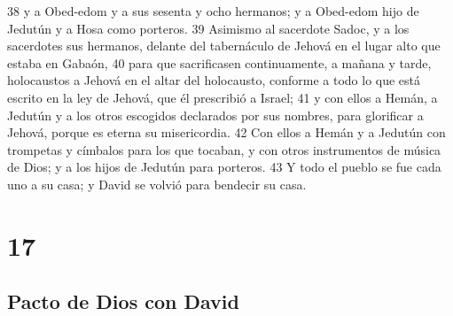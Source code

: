 38 y a Obed-edom y a sus sesenta y ocho hermanos; y a Obed-edom hijo de Jedutún y a Hosa como porteros.
39 Asimismo al sacerdote Sadoc, y a los sacerdotes sus hermanos, delante del tabernáculo de Jehová en el lugar alto que estaba en Gabaón,
40 para que sacrificasen continuamente, a mañana y tarde, holocaustos a Jehová en el altar del holocausto, conforme a todo lo que está escrito en la ley de Jehová, que él prescribió a Israel;
41 y con ellos a Hemán, a Jedutún y a los otros escogidos declarados por sus nombres, para glorificar a Jehová, porque es eterna su misericordia. 
42 Con ellos a Hemán y a Jedutún con trompetas y címbalos para los que tocaban, y con otros instrumentos de música de Dios; y a los hijos de Jedutún para porteros.
43 Y todo el pueblo se fue cada uno a su casa; y David se volvió para bendecir su casa. 

\chapter{17}

\section*{Pacto de Dios con David }



